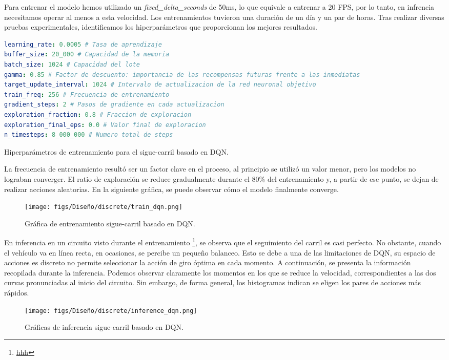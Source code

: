 Para entrenar el modelo hemos utilizado un \textit{fixed\_delta\_seconds} de 50ms, lo que equivale a entrenar a 20 \ac{FPS}, por lo tanto, en infrencia necesitamos operar al menos a esta velocidad. Los entrenamientos tuvieron una duración de un día y un par de horas. Tras realizar diversas pruebas experimentales, identificamos los hiperparámetros que proporcionan los mejores resultados. 
\begin{code}[h]
\begin{lstlisting}[language=yaml]
learning_rate: 0.0005 # Tasa de aprendizaje
buffer_size: 20_000 # Capacidad de la memoria
batch_size: 1024 # Capacidad del lote
gamma: 0.85 # Factor de descuento: importancia de las recompensas futuras frente a las inmediatas
target_update_interval: 1024 # Intervalo de actualizacion de la red neuronal objetivo
train_freq: 256 # Frecuencia de entrenamiento
gradient_steps: 2 # Pasos de gradiente en cada actualizacion
exploration_fraction: 0.8 # Fraccion de exploracion
exploration_final_eps: 0.0 # Valor final de exploracion
n_timesteps: 8_000_000 # Numero total de steps

\end{lstlisting}
\caption[Hiperparámetros de entrenamiento para el sigue-carril basado en \ac{DQN}]{Hiperparámetros de entrenamiento para el sigue-carril basado en \ac{DQN}.}
\label{cod:hiper_params_dqn}
\end{code}

La frecuencia de entrenamiento resultó ser un factor clave en el proceso, al principio se utilizó un valor menor, pero los modelos no lograban converger. El ratio de exploración se reduce gradualmente durante el 80\% del entrenamiento y, a partir de ese punto, se dejan de realizar acciones aleatorias. En la siguiente gráfica, se puede observar cómo el modelo finalmente converge.
\begin{figure}[ht]
  \centering
  \texttt{[image: figs/Diseño/discrete/train\_dqn.png]}
  \caption{Gráfica de entrenamiento sigue-carril basado en \ac{DQN}.}
  \label{fig:train_dqn}
\end{figure}

\newpage

En inferencia en un circuito visto durante el entrenamiento \footnote{\url{hhh}}, se observa que el seguimiento del carril es casi perfecto. No obstante, cuando el vehículo va en línea recta, en ocasiones, se percibe un pequeño balanceo. Esto se debe a una de las limitaciones de \ac{DQN}, su espacio de acciones es discreto no permite seleccionar la acción de giro óptima en cada momento. A continuación, se presenta la información recopilada durante la inferencia. Podemos observar claramente los momentos en los que se reduce la velocidad, correspondientes a las dos curvas pronunciadas al inicio del circuito. Sin embargo, de forma general, los histogramas indican se eligen los pares de acciones más rápidos.
\begin{figure}[ht]
  \centering
  \texttt{[image: figs/Diseño/discrete/inference\_dqn.png]}
  \caption{Gráficas de inferencia sigue-carril basado en \ac{DQN}.}
  \label{fig:inference_dqn}
\end{figure}

